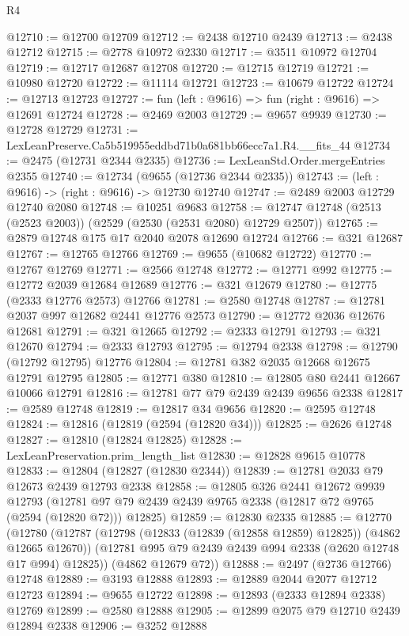\begin{lexlean}{R4}
\begin{coremodule}
@12710 := @12700 @12709
@12712 := @2438 @12710 @2439
@12713 := @2438 @12712
@12715 := @2778 @10972 @2330
@12717 := @3511 @10972 @12704
@12719 := @12717 @12687 @12708
@12720 := @12715 @12719
@12721 := @10980 @12720
@12722 := @11114 @12721
@12723 := @10679 @12722
@12724 := @12713 @12723
@12727 := fun (left : @9616) => fun (right : @9616) => @12691 @12724
@12728 := @2469 @2003
@12729 := @9657 @9939
@12730 := @12728 @12729
@12731 := LexLeanPreserve.Ca5b519955eddbd71b0a681bb66ecc7a1.R4.__fits_44
@12734 := @2475 (@12731 @2344 @2335)
@12736 := LexLeanStd.Order.mergeEntries @2355
@12740 := @12734 (@9655 (@12736 @2344 @2335))
@12743 := (left : @9616) -> (right : @9616) -> @12730 @12740
@12747 := @2489 @2003 @12729 @12740 @2080
@12748 := @10251 @9683
@12758 := @12747 @12748 (@2513 (@2523 @2003)) (@2529 (@2530 (@2531 @2080) @12729 @2507))
@12765 := @2879 @12748 @175 @17 @2040 @2078 @12690 @12724
@12766 := @321 @12687
@12767 := @12765 @12766
@12769 := @9655 (@10682 @12722)
@12770 := @12767 @12769
@12771 := @2566 @12748
@12772 := @12771 @992
@12775 := @12772 @2039 @12684 @12689
@12776 := @321 @12679
@12780 := @12775 (@2333 @12776 @2573) @12766
@12781 := @2580 @12748
@12787 := @12781 @2037 @997 @12682 @2441 @12776 @2573
@12790 := @12772 @2036 @12676 @12681
@12791 := @321 @12665
@12792 := @2333 @12791
@12793 := @321 @12670
@12794 := @2333 @12793
@12795 := @12794 @2338
@12798 := @12790 (@12792 @12795) @12776
@12804 := @12781 @382 @2035 @12668 @12675 @12791 @12795
@12805 := @12771 @380
@12810 := @12805 @80 @2441 @12667 @10066 @12791
@12816 := @12781 @77 @79 @2439 @2439 @9656 @2338
@12817 := @2589 @12748
@12819 := @12817 @34 @9656
@12820 := @2595 @12748
@12824 := @12816 (@12819 (@2594 (@12820 @34)))
@12825 := @2626 @12748
@12827 := @12810 (@12824 @12825)
@12828 := LexLeanPreservation.prim_length_list
@12830 := @12828 @9615 @10778
@12833 := @12804 (@12827 (@12830 @2344))
@12839 := @12781 @2033 @79 @12673 @2439 @12793 @2338
@12858 := @12805
    @326
    @2441
    @12672
    @9939
    @12793
    (@12781 @97 @79 @2439 @2439 @9765 @2338 (@12817 @72 @9765 (@2594 (@12820 @72))) @12825)
@12859 := @12830 @2335
@12885 := @12770
    (@12780
      (@12787
        (@12798 (@12833 (@12839 (@12858 @12859) @12825)) (@4862 @12665 @12670))
        (@12781 @995 @79 @2439 @2439 @994 @2338 (@2620 @12748 @17 @994) @12825))
      (@4862 @12679 @72))
@12888 := @2497 (@2736 @12766) @12748
@12889 := @3193 @12888
@12893 := @12889 @2044 @2077 @12712 @12723
@12894 := @9655 @12722
@12898 := @12893 (@2333 @12894 @2338) @12769
@12899 := @2580 @12888
@12905 := @12899 @2075 @79 @12710 @2439 @12894 @2338
@12906 := @3252 @12888

\end{coremodule}
\end{lexlean}
